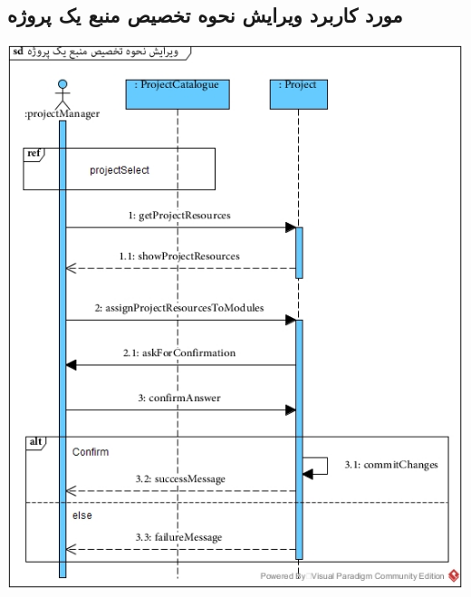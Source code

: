 \newpage
\vspace{2cm}
\subsection*{مورد کاربرد ویرایش نحوه تخصیص منبع یک پروژه}
\vspace{2cm}
\begin{center}
\includegraphics[width=\textwidth]{SequenceDiagrams/39.jpg}
\end{center}

